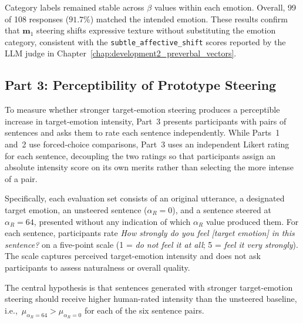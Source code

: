Category labels remained stable across $\beta$ values within each emotion. Overall, 99 of 108 responses ($91.7\%$) matched the intended emotion. These results confirm that $\mathbf{m}_1$ steering shifts expressive texture without substituting the emotion category, consistent with the \texttt{subtle\_affective\_shift} scores reported by the LLM judge in Chapter~\ref{chap:development2_preverbal_vectors}.\par

\subsection{Part 3: Perceptibility of Prototype Steering}

To measure whether stronger target-emotion steering produces a perceptible increase in target-emotion intensity, Part~3 presents participants with pairs of sentences and asks them to rate each sentence independently. While Parts~1 and~2 use forced-choice comparisons, Part~3 uses an independent Likert rating for each sentence, decoupling the two ratings so that participants assign an absolute intensity score on its own merits rather than selecting the more intense of a pair.\par

Specifically, each evaluation set consists of an original utterance, a designated target emotion, an unsteered sentence ($\alpha_R = 0$), and a sentence steered at $\alpha_R = 64$, presented without any indication of which $\alpha_R$ value produced them. For each sentence, participants rate \textit{How strongly do you feel [target emotion] in this sentence?} on a five-point scale (1 = \textit{do not feel it at all}; 5 = \textit{feel it very strongly}). The scale captures perceived target-emotion intensity and does not ask participants to assess naturalness or overall quality.\par

The central hypothesis is that sentences generated with stronger target-emotion steering should receive higher human-rated intensity than the unsteered baseline, i.e.,\ $\mu_{\alpha_R=64} > \mu_{\alpha_R=0}$ for each of the six sentence pairs.\par

